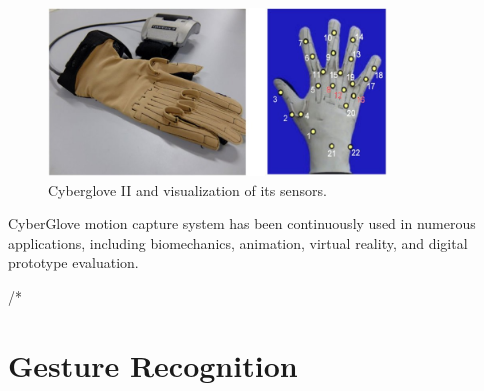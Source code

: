 \begin{figure}[ht!]
	\centering
		\includegraphics[width=0.80\textwidth]{images/cyberglove.png}
		\caption{Cyberglove II and visualization of its sensors. }
		\label{fig:glove}
\end{figure}

 CyberGlove motion capture system has been continuously used in numerous applications, including biomechanics, animation, virtual reality, and digital prototype evaluation.














\iffalse
/*\section{Gesture Recognition}

